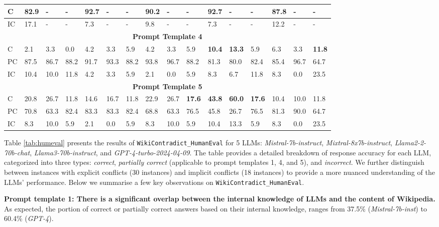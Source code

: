 \documentclass{article}
\begin{document}
\begin{table}[t]
\begin{footnotesize}
\begin{tabular}{|p{0.25cm}|p{0.46cm}|p{0.475cm}|p{0.46cm}|p{0.46cm}|p{0.475cm}|p{0.46cm}|p{0.46cm}|p{0.46cm}|p{0.46cm}|p{0.46cm}|p{0.475cm}|p{0.46cm}|p{0.46cm}|p{0.475cm}|p{0.46cm}|}
        C & 82.9 & -& - & \textbf{92.7} & - & - & 90.2 & - & - & \textbf{92.7} & - & - & 87.8 & - & - \\ \hline
        IC & 17.1 & - & - & 7.3 & - & - & 9.8 & - & - & 7.3 & - & - & 12.2 & - & - \\ \hline
         \multicolumn{16}{|c|}{\textbf{Prompt Template 4}} \\ \hline
       C & 2.1 & 3.3 & 0.0 & 4.2 & 3.3 & 5.9 & 4.2 & 3.3 & 5.9 & \textbf{10.4} & \textbf{13.3} & 5.9 & 6.3 & 3.3 & \textbf{11.8} \\ \hline
        PC & 87.5 & 86.7 & 88.2 & 91.7 & 93.3 & 88.2 & 93.8 & 96.7 & 88.2 & 81.3 & 80.0 & 82.4 & 85.4 & 96.7 & 64.7 \\ \hline
        IC & 10.4 & 10.0 & 11.8 & 4.2 & 3.3 & 5.9 & 2.1 & 0.0 & 5.9 & 8.3 & 6.7 & 11.8 & 8.3 & 0.0 & 23.5 \\ \hline
        \multicolumn{16}{|c|}{\textbf{Prompt Template 5}} \\ \hline
        C & 20.8 & 26.7 & 11.8 & 14.6 & 16.7 & 11.8 & 22.9 & 26.7 & \textbf{17.6} & \textbf{43.8} & \textbf{60.0} & \textbf{17.6} & 10.4 & 10.0 & 11.8 \\ \hline
        PC & 70.8 & 63.3 & 82.4 & 83.3 & 83.3 & 82.4 & 68.8 & 63.3 & 76.5 & 45.8 & 26.7 & 76.5 & 81.3 & 90.0 & 64.7 \\ \hline
        IC & 8.3 & 10.0 & 5.9 & 2.1 & 0.0 & 5.9 & 8.3 & 10.0 & 5.9 & 10.4 & 13.3 & 5.9 & 8.3 & 0.0 & 23.5 \\ \hline
        \end{tabular}
    \end{footnotesize}
\end{table}


Table \ref{tab:humeval} presents the results of \texttt{WikiContradict\_HumanEval} for 5 LLMs: \emph{Mistral-7b-instruct}, \emph{Mixtral-8x7b-instruct}, \emph{Llama2-2-70b-chat}, \emph{Llama3-70b-instruct}, and \emph{GPT-4-turbo-2024-04-09}. The table provides a detailed breakdown of response accuracy for each LLM, categorized into three types: \emph{correct}, \emph{partially correct} (applicable to prompt templates 1, 4, and 5), and \emph{incorrect}. We further distinguish between instances with explicit conflicts (30 instances) and implicit conflicts (18 instances) to provide a more nuanced understanding of the LLMs' performance. Below we summarise a few key observations on \texttt{WikiContradict\_HumanEval}.

\textbf{Prompt template 1: There is a significant overlap between the internal knowledge of LLMs and the content of Wikipedia.} As expected, the portion of correct or partially correct answers based on their internal knowledge, ranges from 37.5\% (\emph{Mistral-7b-inst}) to 60.4\% (\emph{GPT-4}). 
\end{document}
